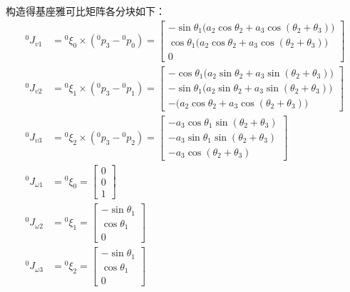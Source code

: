 \documentclass[UTF8, 12pt]{ctexart}
\begin{document}
构造得基座雅可比矩阵各分块如下：
\[
\begin{aligned}
    {}^0 J_{v1} &= {}^0\xi_0 \times ({}^0 p_3 - {}^0 p_0)
                = \begin{bmatrix}
                    -\sin\theta_1\big(a_2\cos\theta_2 + a_3\cos(\theta_2+\theta_3)\big) \\
                    \cos\theta_1\big(a_2\cos\theta_2 + a_3\cos(\theta_2+\theta_3)\big) \\
                    0
                \end{bmatrix} \\
    {}^0 J_{v2} &= {}^0\xi_1 \times ({}^0 p_3 - {}^0 p_1)
                = \begin{bmatrix}
                    -\cos\theta_1\big(a_2\sin\theta_2 + a_3\sin(\theta_2+\theta_3)\big) \\
                    -\sin\theta_1\big(a_2\sin\theta_2 + a_3\sin(\theta_2+\theta_3)\big) \\
                    -\big(a_2\cos\theta_2 + a_3\cos(\theta_2+\theta_3)\big)
                \end{bmatrix} \\
    {}^0 J_{v3} &= {}^0\xi_2 \times ({}^0 p_3 - {}^0 p_2)
                = \begin{bmatrix}
                    -a_3\cos\theta_1\sin(\theta_2+\theta_3) \\
                    -a_3\sin\theta_1\sin(\theta_2+\theta_3) \\
                    -a_3\cos(\theta_2+\theta_3)
                \end{bmatrix} \\
    {}^0 J_{\omega1} &= {}^0\xi_0
                = \begin{bmatrix}
                    0 \\ 0 \\ 1
                \end{bmatrix} \\
    {}^0 J_{\omega2} &= {}^0\xi_1
                = \begin{bmatrix}
                    -\sin\theta_1 \\ \cos\theta_1 \\ 0
                \end{bmatrix} \\
    {}^0 J_{\omega3} &= {}^0\xi_2
                = \begin{bmatrix}
                    -\sin\theta_1 \\ \cos\theta_1 \\ 0
                \end{bmatrix} \\
\end{aligned}
\]
\end{document}
